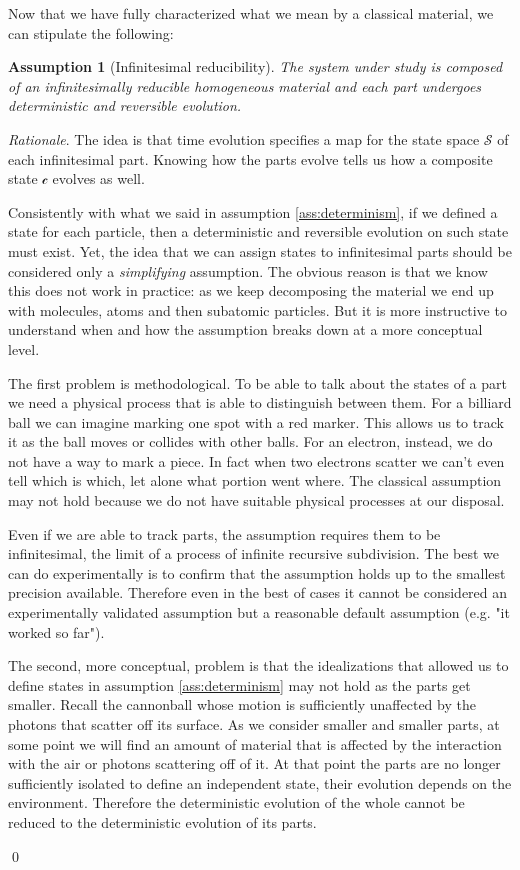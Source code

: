 \documentclass[aps,pra,10pt,twocolumn,floatfix,nofootinbib]{revtex4-1}
\numberwithin{equation}{section}
\newtheorem{assump}{Assumption}
\theoremstyle{definition}
\newenvironment{rationale}{\emph{Rationale}.}{\qed}
\begin{document}
Now that we have fully characterized what we mean by a classical material, we can stipulate the following:

\begin{assump}[Infinitesimal reducibility]\label{ass:infinitesimal_reducibility}
	The system under study is composed of an infinitesimally reducible homogeneous material and each part undergoes deterministic and reversible evolution.
\end{assump}

\begin{rationale}
	The idea is that time evolution specifies a map for the state space $\mathcal{S}$ of each infinitesimal part. Knowing how the parts evolve tells us how a composite state $\mathcal{c}$ evolves as well.
	
	Consistently with what we said in assumption \ref{ass:determinism}, if we defined a state for each particle, then a deterministic and reversible evolution on such state must exist. Yet, the idea that we can assign states to infinitesimal parts should be considered only a \emph{simplifying} assumption. The obvious reason is that we know this does not work in practice: as we keep decomposing the material we end up with molecules, atoms and then subatomic particles. But it is more instructive to understand when and how the assumption breaks down at a more conceptual level.
	
	The first problem is methodological. To be able to talk about the states of a part we need a physical process that is able to distinguish between them. For a billiard ball we can imagine marking one spot with a red marker. This allows us to track it as the ball moves or collides with other balls. For an electron, instead, we do not have a way to mark a piece. In fact when two electrons scatter we can't even tell which is which, let alone what portion went where. The classical assumption may not hold because we do not have suitable physical processes at our disposal.
	
    Even if we are able to track parts, the assumption requires them to be infinitesimal, the limit of a process of infinite recursive subdivision. The best we can do experimentally is to confirm that the assumption holds up to the smallest precision available. Therefore even in the best of cases it cannot be considered an experimentally validated assumption but a reasonable default assumption (e.g. "it worked so far").
	
	The second, more conceptual, problem is that the idealizations that allowed us to define states in assumption \ref{ass:determinism} may not hold as the parts get smaller. Recall the cannonball whose motion is sufficiently unaffected by the photons that scatter off its surface. As we consider smaller and smaller parts, at some point we will find an amount of material that is affected by the interaction with the air or photons scattering off of it. At that point the parts are no longer sufficiently isolated to define an independent state, their evolution depends on the environment. Therefore the deterministic evolution of the whole cannot be reduced to the deterministic evolution of its parts.
	

\end{rationale}
\end{document}
